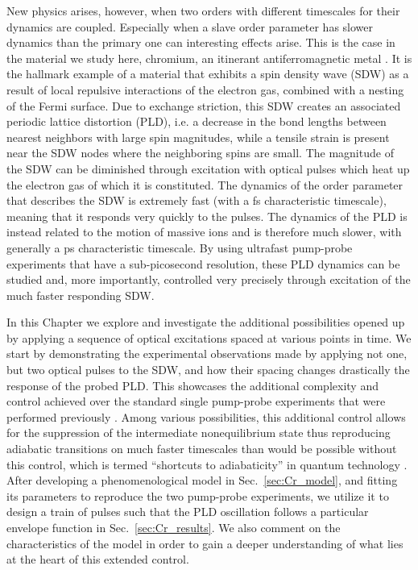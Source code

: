 New physics arises, however, when two orders with different timescales for their dynamics are coupled.
Especially when a slave order parameter has slower dynamics than the primary one can interesting effects arise.
This is the case in the material we study here, chromium, an itinerant antiferromagnetic metal \cite{Kulikov1984,Fawcett1988}.
It is the hallmark example of a material that exhibits a spin density wave (SDW) as a result of local repulsive interactions of the electron gas, combined with a nesting of the Fermi surface.
Due to exchange striction, this SDW creates an associated periodic lattice distortion (PLD), i.e. a decrease in the bond lengths between nearest neighbors with large spin magnitudes, while a tensile strain is present near the SDW nodes where the neighboring spins are small. 
The magnitude of the SDW can be diminished through excitation with optical pulses which heat up the electron gas of which it is constituted.
The dynamics of the order parameter that describes the SDW is extremely fast (with a fs characteristic timescale), meaning that it responds very quickly to the pulses.
The dynamics of the PLD is instead related to the motion of massive ions and is therefore much slower, with generally a ps characteristic timescale.
By using ultrafast pump-probe experiments that have a sub-picosecond resolution, these PLD dynamics can be studied and, more importantly, controlled very precisely through excitation of the much faster responding SDW.

In this Chapter we explore and investigate the additional possibilities opened up by applying a sequence of optical excitations spaced at various points in time.
We start by demonstrating the experimental observations made by applying not one, but two optical pulses to the SDW, and how their spacing changes drastically the response of the probed PLD.
This showcases the additional complexity and control achieved over the standard single pump-probe experiments that were performed previously \cite{Singer2015prb, Singer2015prb}. 
Among various possibilities, this additional control allows for the suppression of the intermediate nonequilibrium state thus reproducing adiabatic transitions on much faster timescales than would be possible without this control, which is termed ``shortcuts to adiabaticity'' in quantum technology \cite{Torrontegui2013,Deffner2014,Zhou2017}.
After developing a phenomenological model in Sec.~\ref{sec:Cr_model}, and fitting its parameters to reproduce the two pump-probe experiments, we utilize it to design a train of pulses such that the PLD oscillation follows a particular envelope function in Sec.~\ref{sec:Cr_results}.
We also comment on the characteristics of the model in order to gain a deeper understanding of what lies at the heart of this extended control. 

